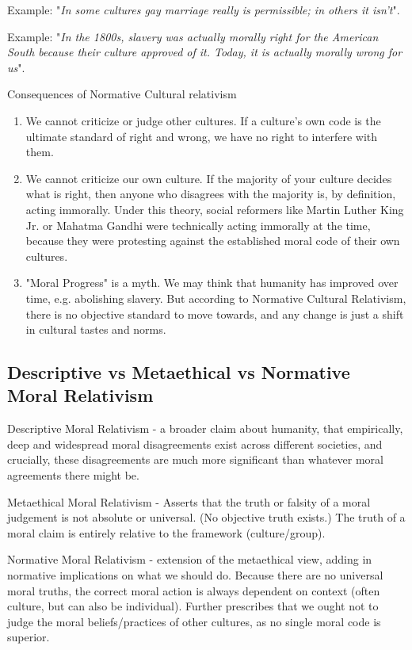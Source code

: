 \documentclass[12pt]{article}
\begin{document}
\noindent Example: "\textit{In some cultures gay marriage really is permissible; in others it isn't}".

\noindent Example: "\textit{In the 1800s, slavery was actually morally right for the American South because their culture approved of it. Today, it is actually morally wrong for us}".

\noindent Consequences of Normative Cultural relativism
\begin{enumerate}
    \item We cannot criticize or judge other cultures.
    If a culture's own code is the ultimate standard of right and wrong, we have no right to interfere with them.
    \item We cannot criticize our own culture.
    If the majority of your culture decides what is right, then anyone who disagrees with the majority is, by definition, acting immorally.
    Under this theory, social reformers like Martin Luther King Jr. or Mahatma Gandhi were technically acting immorally at the time, because they were protesting against the established moral code of their own cultures.
    \item "Moral Progress" is a myth. We may think that humanity has improved over time, e.g. abolishing slavery.
    But according to Normative Cultural Relativism, there is no objective standard to move towards, and any change is just a shift in cultural tastes and norms.
\end{enumerate}

\subsection{Descriptive vs Metaethical vs Normative Moral Relativism}
Descriptive Moral Relativism - a broader claim about humanity, that empirically, deep and widespread moral disagreements exist across different societies, 
and crucially, these disagreements are much more significant than whatever moral agreements there might be.

\noindent Metaethical Moral Relativism - Asserts that the truth or falsity of a moral judgement is not absolute or universal. (No objective truth exists.)
The truth of a moral claim is entirely relative to the framework (culture/group).

\noindent Normative Moral Relativism - extension of the metaethical view, adding in normative implications on what we should do.
Because there are no universal moral truths, the correct moral action is always dependent on context (often culture, but can also be individual).
Further prescribes that we ought not to judge the moral beliefs/practices of other cultures, as no single moral code is superior.
\end{document}
